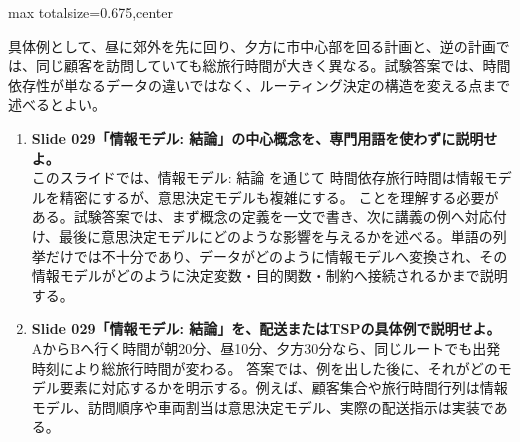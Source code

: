 \begin{adjustbox}{max totalsize={\textwidth}{0.675\textheight},center}
\begin{minipage}{\textwidth}
\begin{minipage}[t]{0.485\textwidth}
具体例として、昼に郊外を先に回り、夕方に市中心部を回る計画と、逆の計画では、同じ顧客を訪問していても総旅行時間が大きく異なる。試験答案では、時間依存性が単なるデータの違いではなく、ルーティング決定の構造を変える点まで述べるとよい。\par
{}
\begin{enumerate}
\item \textbf{Slide 029「情報モデル: 結論」の中心概念を、専門用語を使わずに説明せよ。}\\このスライドでは、情報モデル: 結論 を通じて 時間依存旅行時間は情報モデルを精密にするが、意思決定モデルも複雑にする。 ことを理解する必要がある。試験答案では、まず概念の定義を一文で書き、次に講義の例へ対応付け、最後に意思決定モデルにどのような影響を与えるかを述べる。単語の列挙だけでは不十分であり、データがどのように情報モデルへ変換され、その情報モデルがどのように決定変数・目的関数・制約へ接続されるかまで説明する。
\item \textbf{Slide 029「情報モデル: 結論」を、配送またはTSPの具体例で説明せよ。}\\AからBへ行く時間が朝20分、昼10分、夕方30分なら、同じルートでも出発時刻により総旅行時間が変わる。 答案では、例を出した後に、それがどのモデル要素に対応するかを明示する。例えば、顧客集合や旅行時間行列は情報モデル、訪問順序や車両割当は意思決定モデル、実際の配送指示は実装である。
\end{enumerate}
\end{minipage}
\end{minipage}
\end{adjustbox}

